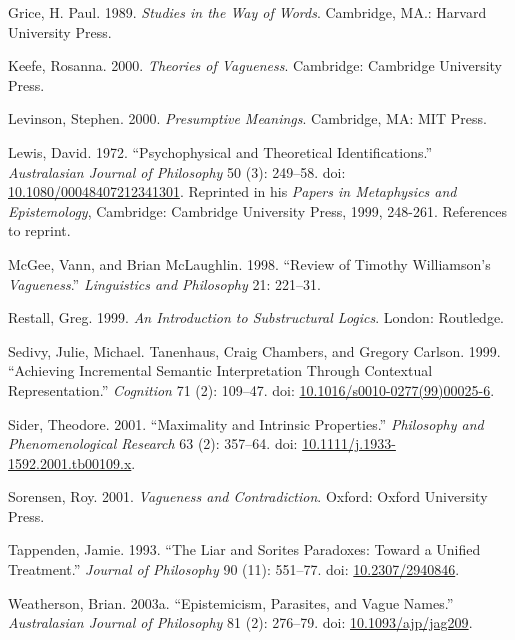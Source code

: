\documentclass[
  10pt,
  letterpaper,
  DIV=11,
  numbers=noendperiod,
  twoside]{scrartcl}
\newlength{\cslhangindent}
\newenvironment{CSLReferences}[2] %
 {\begin{list}{}{%
  \setlength{\itemindent}{0pt}
  \setlength{\leftmargin}{0pt}
  \setlength{\parsep}{0pt}
  \ifodd #1
   \setlength{\leftmargin}{\cslhangindent}
   \setlength{\itemindent}{-1\cslhangindent}
  \fi
  \setlength{\itemsep}{#2\baselineskip}}}
 {\end{list}}
\begin{document}
\begin{CSLReferences}{1}{0}
Grice, H. Paul. 1989. \emph{Studies in the Way of Words}. Cambridge,
MA.: Harvard University Press.

Keefe, Rosanna. 2000. \emph{Theories of Vagueness}. Cambridge: Cambridge
University Press.

Levinson, Stephen. 2000. \emph{Presumptive Meanings}. Cambridge, MA: MIT
Press.

Lewis, David. 1972. {``Psychophysical and Theoretical
Identifications.''} \emph{Australasian Journal of Philosophy} 50 (3):
249--58. doi:
\href{https://doi.org/10.1080/00048407212341301}{10.1080/00048407212341301}.
Reprinted in his \emph{Papers in Metaphysics and Epistemology},
Cambridge: Cambridge University Press, 1999, 248-261. References to
reprint.

McGee, Vann, and Brian McLaughlin. 1998. {``Review of Timothy
Williamson's \emph{Vagueness}.''} \emph{Linguistics and Philosophy} 21:
221--31.

Restall, Greg. 1999. \emph{An Introduction to Substructural Logics}.
London: Routledge.

Sedivy, Julie, Michael. Tanenhaus, Craig Chambers, and Gregory Carlson.
1999. {``Achieving Incremental Semantic Interpretation Through
Contextual Representation.''} \emph{Cognition} 71 (2): 109--47. doi:
\href{https://doi.org/10.1016/s0010-0277(99)00025-6}{10.1016/s0010-0277(99)00025-6}.

Sider, Theodore. 2001. {``Maximality and Intrinsic Properties.''}
\emph{Philosophy and Phenomenological Research} 63 (2): 357--64. doi:
\href{https://doi.org/10.1111/j.1933-1592.2001.tb00109.x}{10.1111/j.1933-1592.2001.tb00109.x}.

Sorensen, Roy. 2001. \emph{Vagueness and Contradiction}. Oxford: Oxford
University Press.

Tappenden, Jamie. 1993. {``The Liar and Sorites Paradoxes: Toward a
Unified Treatment.''} \emph{Journal of Philosophy} 90 (11): 551--77.
doi: \href{https://doi.org/10.2307/2940846}{10.2307/2940846}.

Weatherson, Brian. 2003a. {``Epistemicism, Parasites, and Vague
Names.''} \emph{Australasian Journal of Philosophy} 81 (2): 276--79.
doi: \href{https://doi.org/10.1093/ajp/jag209}{10.1093/ajp/jag209}.


\end{CSLReferences}
\end{document}
